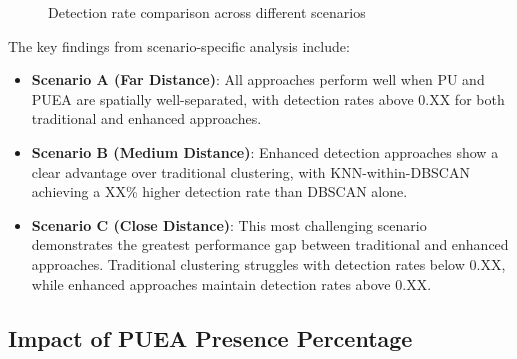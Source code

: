 \documentclass[conference]{IEEEtran}
\begin{document}
\begin{figure}[!t]
\centering
{}
\caption{Detection rate comparison across different scenarios}
\label{fig:scenario_comparison}
\end{figure}

The key findings from scenario-specific analysis include:

\begin{itemize}
    \item \textbf{Scenario A (Far Distance)}: All approaches perform well when PU and PUEA are spatially well-separated, with detection rates above 0.XX for both traditional and enhanced approaches.
    
    \item \textbf{Scenario B (Medium Distance)}: Enhanced detection approaches show a clear advantage over traditional clustering, with KNN-within-DBSCAN achieving a XX\% higher detection rate than DBSCAN alone.
    
    \item \textbf{Scenario C (Close Distance)}: This most challenging scenario demonstrates the greatest performance gap between traditional and enhanced approaches. Traditional clustering struggles with detection rates below 0.XX, while enhanced approaches maintain detection rates above 0.XX.
\end{itemize}

\subsection{Impact of PUEA Presence Percentage}
\end{document}
